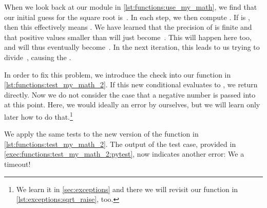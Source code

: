 When we look back at our  module in \cref{lst:functions:use_my_math}, we find that our initial guess for the square root is~.
In each step, we then compute .
If  is , then this effectively means .
We have learned that the precision of  is finite and that positive values smaller than  will just become~.
This will happen here too, and  will thus eventually become~.
In the next iteration, this leads to us trying to divide~, causing the .
%
\FloatBarrier%
%
%
%
%
%
%
%

In order to fix this problem, we introduce the check  into our  function in \cref{lst:functions:test_my_math_2}.
If this new conditional evaluates to , we return~ directly.
Now we do not consider the case that a negative number is passed into  at this point.
Here, we would ideally  an error by ourselves, but we will learn only later how to do that.\footnote{%
We learn it in \cref{sec:exceptions} and there we will revisit our  function in \cref{lst:exceptions:sqrt_raise}, too.}

We apply the same tests to the new version of the  function in \cref{lst:functions:test_my_math_2}.
The output of the test case, provided in \cref{exec:functions:test_my_math_2:pytest}, now indicates another error:
We a timeout!

